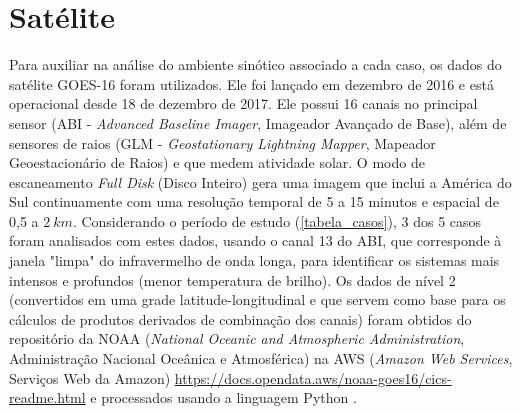 \section{Satélite} \label{goes16}

Para auxiliar na análise do ambiente sinótico associado a cada caso, os dados do satélite GOES-16 foram utilizados. Ele foi lançado em dezembro de 2016 e está operacional desde 18 de dezembro de 2017. Ele possui 16 canais no principal sensor (ABI - \textit{Advanced Baseline Imager}, Imageador Avançado de Base), além de sensores de raios (GLM - \textit{Geostationary Lightning Mapper}, Mapeador Geoestacionário de Raios) e que medem atividade solar. O modo de escaneamento \textit{Full Disk} (Disco Inteiro) gera uma imagem que inclui a América do Sul continuamente com uma resolução temporal de 5 a 15 minutos e espacial de 0,5 a $2\:km$. Considerando o período de estudo (\autoref{tabela_casos}), 3 dos 5 casos foram analisados com estes dados, usando o canal 13 do ABI, que corresponde à janela "limpa" do infravermelho de onda longa, para identificar os sistemas mais intensos e profundos (menor temperatura de brilho). Os dados de nível 2 (convertidos em uma grade latitude-longitudinal e que servem como base para os cálculos de produtos derivados de combinação dos canais) foram obtidos do repositório da NOAA (\textit{National Oceanic and Atmospheric Administration}, Administração Nacional Oceânica e Atmosférica) na AWS (\textit{Amazon Web Services}, Serviços Web da Amazon) \url{https://docs.opendata.aws/noaa-goes16/cics-readme.html} e processados usando a linguagem Python \cite{PythonCoreTeam2018}.